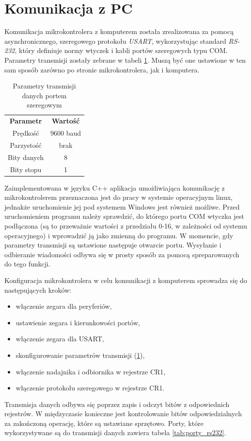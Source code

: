 \documentclass[printmode]{mgr}
\begin{document}
\section{Komunikacja z PC}\label{sec:komunikacja_z_PC}
Komunikacja mikrokontrolera z komputerem została zrealizowana za pomocą asynchronicznego, szeregowego protokołu \emph{USART}, 
wykorzystując standard \emph{RS-232}, który
definiuje normy wtyczek i kabli portów szeregowych typu COM. Parametry transmisji zostały zebrane w tabeli \ref{tab:transmisja}.
Muszą być one ustawione w ten sam sposób zarówno po stronie mikrokontrolera, jak i komputera.

\begin{table}[tp]
  \caption{Parametry transmisji danych portem szeregowym}
  \label{tab:transmisja}
  \centering
  \begin{tabular}{||c|c||}
    \hline\hline
{\bf Parametr} & {\bf Wartość} \\
Prędkość & 9600 baud \\
Parzystość & brak \\
Bity danych & 8 \\
Bity stopu & 1 \\
\hline\hline
  \end{tabular}
\end{table}

Zaimplementowana w języku C++ aplikacja umożliwiająca komunikację z mikrokontrolerem przeznaczona jest do pracy w systemie operacyjnym 
linux, jednakże uruchomienie jej pod systemem Windows jest również możliwe. Przed uruchomieniem programu należy sprawdzić, do którego
portu COM wtyczka jest podłączona (są to przeważnie wartości z przedziału 0-16, w zależności od systemu operacyjnego) i wprowadzić
ją jako zmienną do programu. W momencie, gdy parametry transmisji są ustawione następuje otwarcie portu. Wysyłanie
i odbieranie wiadomości odbywa się w prosty sposób za pomocą spreparowanych do tego funkcji.

Konfiguracja mikrokontrolera w celu komunikacji z komputerem sprowadza się do następujących kroków:
\begin{itemize}
\item włączenie zegara dla peryferiów,
\item ustawienie zegara i kierunkowości portów,
\item włączenie zegara dla USART,
\item skonfigurowanie parametrów transmisji (\ref{tab:transmisja}),
\item włączenie nadajnika i odbiornika w rejestrze CR1,
\item włączenie protokołu szeregowego w rejestrze CR1.
\end{itemize}
Transmisja danych odbywa się poprzez zapis i odczyt bitów z odpowiednich rejestrów. W międzyczasie konieczne jest kontrolowanie bitów odpowiedzialnych
za zakończoną operację, które są ustawiane sprzętowo. Porty, które wykorzystywane są do transmisji danych zawiera tabela \ref{tab:porty_rs232}.
\end{document}
